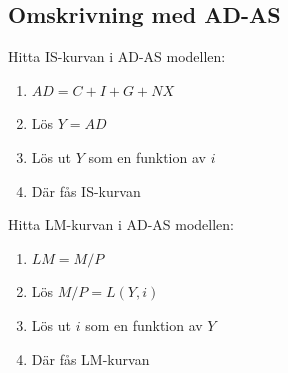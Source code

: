 \documentclass[12pt,a4paper]{article}
\begin{document}
\subsection{Omskrivning med AD-AS}
Hitta IS-kurvan i AD-AS modellen:
\begin{enumerate}
    \item $AD = C + I + G + NX$
    \item Lös $Y = AD$
    \item Lös ut $Y$ som en funktion av $i$
    \item Där fås IS-kurvan
\end{enumerate}

Hitta LM-kurvan i AD-AS modellen:
\begin{enumerate}
    \item $LM = M/P$
    \item Lös $M/P = L(Y, i)$
    \item Lös ut $i$ som en funktion av $Y$
    \item Där fås LM-kurvan
\end{enumerate}
\end{document}

